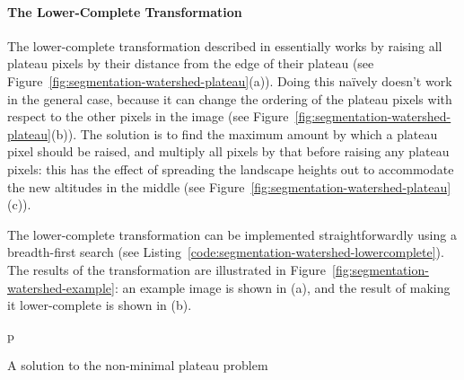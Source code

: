 \paragraph{The Lower-Complete Transformation}

The lower-complete transformation described in \cite{meijster98} essentially works by raising all plateau pixels by their distance from the edge of their plateau (see Figure~\ref{fig:segmentation-watershed-plateau}(a)). Doing this na\"ively doesn't work in the general case, because it can change the ordering of the plateau pixels with respect to the other pixels in the image (see Figure~\ref{fig:segmentation-watershed-plateau}(b)). The solution is to find the maximum amount by which a plateau pixel should be raised, and multiply all pixels by that before raising any plateau pixels: this has the effect of spreading the landscape heights out to accommodate the new altitudes in the middle (see Figure~\ref{fig:segmentation-watershed-plateau}(c)).

The lower-complete transformation can be implemented straightforwardly using a breadth-first search (see Listing~\ref{code:segmentation-watershed-lowercomplete}). The results of the transformation are illustrated in Figure~\ref{fig:segmentation-watershed-example}: an example image is shown in (a), and the result of making it lower-complete is shown in (b).

\begin{stusubfig}{p}
%
	\hspace{4mm}%
	\hspace{4mm}%
\caption{A solution to the non-minimal plateau problem}
\label{fig:segmentation-watershed-plateau}
\end{stusubfig}

